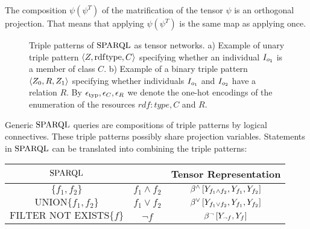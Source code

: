 The composition $\psi (\psi^T)$ of the matrification of the tensor $\psi$ is an orthogonal projection.
That means that applying $\psi (\psi^T)$ is the same map as applying once.


\begin{figure}[t]
    \begin{center}
        
    \end{center}
    \caption{Triple patterns of $\mathrm{SPARQL}$ as tensor networks.
    a) Example of unary triple pattern $\braket{Z,\mathrm{rdf}\mathrm{type},C}$ specifying whether an individual $I_{o_{1}}$ is a member of class $C$.
    b) Example of a binary triple pattern $\braket{Z_{0},R,Z_{1}}$ specifying whether individuals $I_{o_{1}}$ and $I_{o_{2}}$ have a relation $R$.
    By $\epsilon_{\mathrm{typ}},\epsilon_{C},\epsilon_{R}$ we denote the one-hot encodings of the enumeration of the resources $rdf:type, C$ and $R$.
    }
    \label{fig:triplePatterns}
\end{figure}





Generic $\mathrm{SPARQL}$ queries are compositions of triple patterns by logical connectives. %
These triple patterns possibly share projection variables.
Statements in $\mathrm{SPARQL}$ can be translated into \propositionalLogic{} combining the triple patterns:
\begin{center}
    \begin{tabular}{|c|c|c|}
        \hline
        \textbf{$\mathrm{SPARQL}$}                                        & \textbf{\PropositionalLogic{}} & \textbf{Tensor Representation}                                                                   \\
        \hline
        $\{f_1, f_2\}$                                            & $f_1\land f_2$                 & $\beta^{\land}\left[Y_{f_1\land f_2},Y_{f_1},Y_{f_2}\right]$ \\
        \hline
        $\mathrm{UNION}\{f_1, f_2\} $                             & $f_1\lor f_2$                  & $\beta^{\lor}\left[Y_{f_1\lor f_2},Y_{f_1},Y_{f_2}\right]$   \\
        \hline
        $\mathrm{FILTER}\,\,\mathrm{NOT}\,\,\mathrm{EXISTS}\{f\}$ & $\lnot f$                      & $\beta^{\lnot}\left[Y_{\lnot f},Y_{f}\right]$                             \\
        \hline
    \end{tabular}
\end{center}

